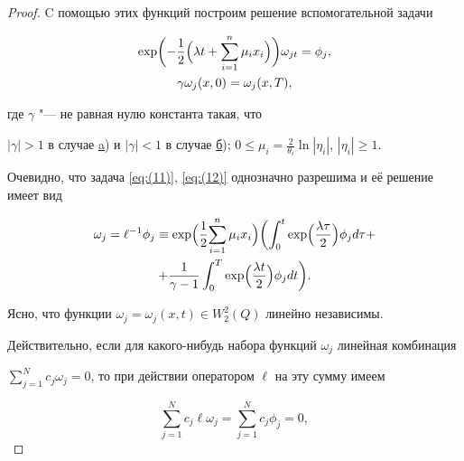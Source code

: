 \begin{proof}
C помощью этих функций построим решение вспомогательной задачи

\begin{gather}

\label{eq:(11)}

\exp \biggl(-\frac{1}{2}\Bigl(\lambda t+\sum\limits_{i=1}^{n}{{{\mu }_{i}}}{{x}_{i}} \Bigr) \biggr) {{\omega }_{jt}}={{\phi }_{j}},

\\

\label{eq:(12)}

 \gamma  {{\omega }_{j}}(x,0)={{\omega }_{j}}(x,T),

\end{gather}

где $\gamma$ "--- не равная нулю константа  такая, что 

$| \gamma |>1$ в случае {\rm \hyperlink{dzh:a}{a})} и $ | \gamma |<1$  в случае {\rm \hyperlink{dzh:b}{б})};   $0\le {{\mu }_{i}}=\frac{2}{{{\theta }_{i}}}\ln \left| {{\eta }_{i}} \right|$, $\left| {{\eta }_{i}} \right|\ge 1.$

Очевидно, что задача \eqref{eq:(11)}, \eqref{eq:(12)} однозначно разрешима и её решение имеет вид

\begin{multline}

\label{eq:(13)}

{{\omega }_{j}}={{\ell }^{-1}}{{\phi }_{j}}\equiv

\exp\Bigl(

\frac12{\sum\limits_{i=1}^{n}{{{\mu }_{i}} {{x}_{i}}}}

\Bigr)

\biggl(

\int_{0}^{t} \exp \Bigl(\frac{\lambda \tau }{2}\Bigr){{\phi }_{j}}d\tau +

\\ +\frac{1}{\gamma -1}\int_{0}^{T} \exp \Bigl(\frac{\lambda t}{2}\Bigr) \phi _j dt\biggr).

\end{multline}



Ясно, что функции ${{\omega }_{j}}={{\omega }_{j}}(x,t)\in W_{2}^{2}(Q)$  линейно независимы.  

Действительно, если для какого-нибудь  набора функций ${{\omega }_{j}}$ линейная комбинация  

$\sum_{j=1}^{N}{{{c}_{j}}{{\omega }_{j}}}=0$, то при действии оператором $\ell $ на эту сумму имеем 

$$\sum\limits_{j=1}^{N}{{{c}_{j}}\ell {{\omega }_{j}}}=\sum\limits_{j=1}^{N}{{{c}_{j}}}{{\phi }_{j}}=0,$$ 


\end{proof}
